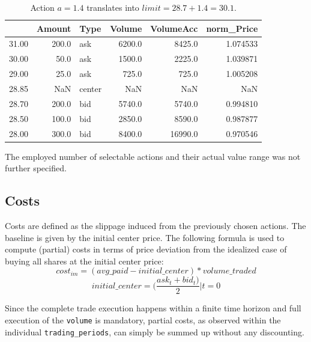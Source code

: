 \begin{table}
\centering
\begin{tabular}{lrlrrr}
\toprule
{} &  Amount &    Type &  Volume &  VolumeAcc &  norm\_Price \\
\midrule
31.00 &   200.0 &     ask &  6200.0 &     8425.0 &    1.074533 \\
30.00 &    50.0 &     ask &  1500.0 &     2225.0 &    1.039871 \\
29.00 &    25.0 &     ask &   725.0 &      725.0 &    1.005208 \\
28.85 &     NaN &  center &     NaN &        NaN &         NaN \\
28.70 &   200.0 &     bid &  5740.0 &     5740.0 &    0.994810 \\
28.50 &   100.0 &     bid &  2850.0 &     8590.0 &    0.987877 \\
28.00 &   300.0 &     bid &  8400.0 &    16990.0 &    0.970546 \\
\bottomrule
\end{tabular}
\caption{Action $a=1.4$ translates into $limit=28.7 + 1.4 = 30.1$.}
\label{table:orderbook:example:again}
\end{table}

The employed number of selectable actions and their actual value range was not further specified.


\subsection{Costs}
\label{chap:costs}
Costs are defined as the slippage induced from the previously chosen actions. The baseline is given by the initial center price. The following formula is used to compute (partial) costs in terms of price deviation from the idealized case of buying all shares at the initial center price:
\begin{equation}
\label{eq:imcost}
   cost_{im} = (avg\_paid - initial\_center) * volume\_traded
\end{equation}
\begin{equation}
   initial\_center = (\dfrac{ask_t+bid_t)}{2} | t=0
\end{equation}

Since the complete trade execution happens within a finite time horizon and full execution of the \lstinline!volume! is mandatory, partial costs, as observed within the individual \lstinline!trading_periods!, can simply be summed up without any discounting.\\

